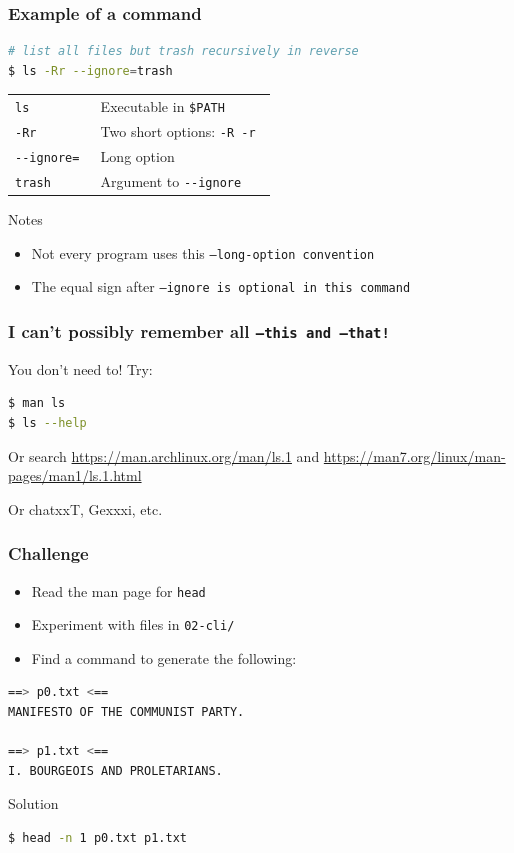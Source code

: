 \begin{frame}[fragile]
\frametitle{Example of a command}
\begin{lstlisting}[language=bash]
# list all files but trash recursively in reverse
$ ls -Rr --ignore=trash
\end{lstlisting}
\begin{tabular}{ll}
    \tt{ls}             & Executable in \tt{\$PATH} \\
    \tt{-Rr}            & Two short options: \tt{-R -r} \\
    \tt{-{}-ignore=}      & Long option \\
    \tt{trash}          & Argument to \tt{-{}-ignore}
\end{tabular}
\begin{block}{Notes}
    \begin{itemize}
        \item Not every program uses this \tt{--long-option} convention
        \item The equal sign after \tt{--ignore} is optional in this command
    \end{itemize}
\end{block}
\end{frame}

\begin{frame}[fragile]
\frametitle{I can't possibly remember all \tt{--this} and \tt{--that}!}
You don't need to! Try:

\begin{lstlisting}[language=bash]
$ man ls
$ ls --help
\end{lstlisting}
\vspace{0.5em}

Or search \url{https://man.archlinux.org/man/ls.1} and \url{https://man7.org/linux/man-pages/man1/ls.1.html}

Or chatxxT, Gexxxi, etc. 
\end{frame}

\begin{frame}[fragile]
\frametitle{Challenge}
\begin{itemize}
    \item Read the man page for \tt{head}
    \item Experiment with files in \tt{02-cli/}
    \item Find a command to generate the following:
\end{itemize}
\begin{lstlisting}[language=bash]
==> p0.txt <==
MANIFESTO OF THE COMMUNIST PARTY.

==> p1.txt <==
I. BOURGEOIS AND PROLETARIANS.
\end{lstlisting}
\pause
\begin{block}{Solution}
\begin{lstlisting}[language=bash]
$ head -n 1 p0.txt p1.txt
\end{lstlisting}
\end{block}
\end{frame}

